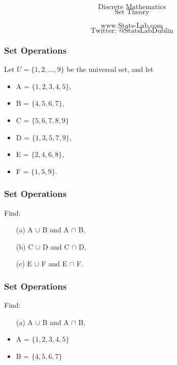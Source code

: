 \documentclass{beamer}
\begin{document}
\begin{frame}
\Huge
\[\mbox{Discrete Mathematics}\]
\Huge
\[\mbox{Set Theory}\]

\Large
\[\mbox{www.Stats-Lab.com}\]
\Large
\[\mbox{Twitter: @StatsLabDublin}\]

\end{frame}
\begin{frame}
\Large
\frametitle{Set Operations}
Let $U = \{1,2,\ldots, 9\}$ be the universal set, and let
\begin{itemize}
\item A = $\{1, 2, 3, 4, 5\}$,  
\item B = $\{4, 5, 6, 7\}$,  
\item C = $\{5, 6, 7, 8, 9\}$
\item D = $\{1, 3, 5, 7, 9\}$,
\item E = $\{2, 4, 6, 8\}$,
\item F = $\{1, 5, 9\}$.
\end{itemize}
\end{frame}
\begin{frame}
\frametitle{Set Operations}
\Large
\vspace{-3cm}
Find: 
\begin{itemize}
\item[(a)] A $\cup$ B and A $\cap$ B, 
\item[(b)] C $\cup$ D and C $\cap$ D, 
\item[(c)] E $\cup$ F and E $\cap$ F.
\end{itemize}

\end{frame}
\begin{frame}
\frametitle{Set Operations}
\Large
\vspace{-3cm}
Find: 
\begin{itemize}
\item[(a)] A $\cup$ B and A $\cap$ B, \bigskip
\item A = $\{1, 2, 3, 4, 5\}$  
\item B = $\{4, 5, 6, 7\}$  
\end{itemize}

\end{frame}
\end{document}
